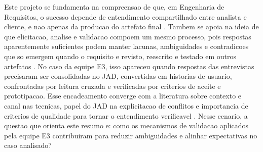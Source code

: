 \documentclass[12pt]{article}
\begin{document}
%
%
%
%
Este projeto se fundamenta na compreensao de que, em Engenharia de Requisitos, o sucesso depende de entendimento compartilhado entre analista e cliente, e nao apenas da producao do artefato final \cite{hofmann2001re}. Tambem se apoia na ideia de que elicitacao, analise e validacao compoem um mesmo processo, pois respostas aparentemente suficientes podem manter lacunas, ambiguidades e contradicoes que so emergem quando o requisito e revisto, reescrito e testado em outros artefatos \cite{hickey2004unified,nuseibeh2000roadmap}. No caso da equipe E3, isso apareceu quando respostas das entrevistas precisaram ser consolidadas no JAD, convertidas em historias de usuario, confrontadas por leitura cruzada e verificadas por criterios de aceite e prototipacao. Esse encadeamento converge com a literatura sobre contexto e canal nas tecnicas, papel do JAD na explicitacao de conflitos e importancia de criterios de qualidade para tornar o entendimento verificavel \cite{carrizo2017context,davidson1999jad,sakthivel1991verification,lucassen2016qus}. Nesse cenario, a questao que orienta este resumo e: como os mecanismos de validacao aplicados pela equipe E3 contribuiram para reduzir ambiguidades e alinhar expectativas no caso analisado?
\end{document}

